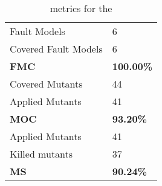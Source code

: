 
\begin{table}[H]

\begin{tabular}{|l|l|}
\hline
Fault Models & 6 \\
Covered Fault Models & 6 \\
\hline
\textbf{FMC} & \textbf{100.00\%} \\
\hline
Covered Mutants & 44 \\
Applied Mutants & 41 \\
\hline
\textbf{MOC} & \textbf{93.20\%} \\
\hline
Applied Mutants & 41 \\
Killed mutants & 37 \\
\hline
\textbf{MS} & \textbf{90.24\%} \\
\hline
\end{tabular}
\caption{\DAMA metrics for the \case}
\label{tab:metrics}
\end{table}
